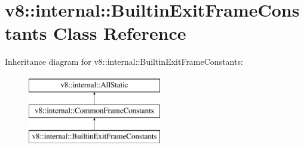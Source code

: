 \hypertarget{classv8_1_1internal_1_1BuiltinExitFrameConstants}{}\section{v8\+:\+:internal\+:\+:Builtin\+Exit\+Frame\+Constants Class Reference}
\label{classv8_1_1internal_1_1BuiltinExitFrameConstants}
Inheritance diagram for v8\+:\+:internal\+:\+:Builtin\+Exit\+Frame\+Constants\+:\begin{figure}[H]
\begin{center}
\leavevmode
\includegraphics[height=3.000000cm]{classv8_1_1internal_1_1BuiltinExitFrameConstants}
\end{center}
\end{figure}
